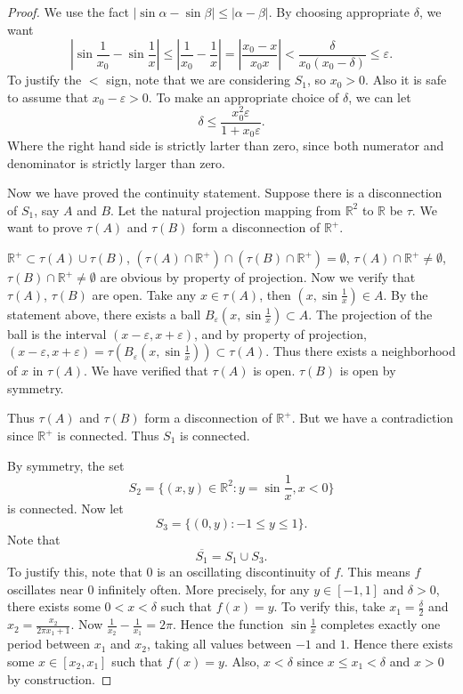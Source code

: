 \begin{enumerate}
\begin{proof}
	We use the fact $\left| \sin \alpha - \sin \beta \right| \le |\alpha-\beta|$.
	By choosing appropriate $\delta$, we want
	\[
		\left| \sin \frac{1}{x_0} - \sin \frac{1}{x} \right| \le \left| \frac{1}{x_0} - \frac{1}{x} \right| = \left| \frac{x_0-x}{x_0x} \right| < \frac{\delta}{x_0(x_0-\delta)} \le \varepsilon
	.\] 
	To justify the $<$ sign, note that we are considering $S_1$, so $x_0 > 0$. Also it is safe to assume that $x_0 - \varepsilon > 0$. To make an appropriate choice of $\delta$, we can let
	\[
		\delta \le \frac{x_0^2 \varepsilon}{1 + x_0 \varepsilon}
	.\] 
	Where the right hand side is strictly larter than zero, since both numerator and denominator is strictly larger than zero.

	Now we have proved the continuity statement. Suppose there is a disconnection of $S_1$, say $A$ and $B$. Let the natural projection mapping from $\mathbb{R}^2$ to $\mathbb{R}$ be $\tau$. We want to prove $\tau(A)$ and $\tau(B)$ form a disconnection of $\mathbb{R}^+$. 

	$\mathbb{R}^+ \subset \tau(A) \cup \tau(B) $, $(\tau(A) \cap \mathbb{R}^+) \cap \left( \tau(B) \cap \mathbb{R}^+ \right) = \emptyset $, $\tau(A) \cap \mathbb{R}^+ \neq \emptyset $, $\tau(B) \cap \mathbb{R}^+ \neq  \emptyset $ are obvious by property of projection. 
	Now we verify that $\tau(A)$, $\tau(B)$ are open. Take any $x \in \tau(A)$, then $(x,\sin \frac{1}{x}) \in A$. By the statement above, there exists a ball $B_\varepsilon(x, \sin \frac{1}{x}) \subset A$. The projection of the ball is the interval $(x-\varepsilon, x+\varepsilon)$, and by property of projection, $(x-\varepsilon, x+\varepsilon)  = \tau(B_\varepsilon(x, \sin \frac{1}{x})) \subset \tau(A)$. Thus there exists a neighborhood of $x$ in $\tau(A)$. We have verified that $\tau(A)$ is open. $\tau(B)$ is open by symmetry.

	Thus $\tau(A)$ and $\tau(B)$ form a disconnection of $\mathbb{R}^+$. But we have a contradiction since $\mathbb{R}^+$ is connected. Thus $S_1$ is connected.

	By symmetry, the set \[
		S_2 = \{(x,y) \in \mathbb{R}^2: y = \sin \frac{1}{x}, x < 0\} 
	\] 
	is connected. Now let 
	\[
		S_3 = \{(0,y): -1 \le y \le 1\} 
	.\] Note that
	\[
		\overline{S_1} = S_1 \cup S_3 
	.\] 
	To justify this, note that $0$ is an oscillating discontinuity of $f$. This means $f$ oscillates near $0$ infinitely often. More precisely, for any $y \in [-1,1]$ and $\delta > 0$, there exists some $0 < x < \delta$ such that $f(x) = y$. To verify this, take $x_1 = \frac{\delta}{2}$ and $x_2 = \frac{x_2}{2 \pi x_1 + 1}$. Now $\frac{1}{x_2} - \frac{1}{x_1} = 2 \pi$. Hence the function $\sin \frac{1}{x}$ completes exactly one period between $x_1$ and $x_2$, taking all values between $-1$ and $1$. Hence there exists some $x \in [x_2,x_1]$ such that $f(x) = y$. Also, $x< \delta$ since $x \le  x_1<\delta$ and $x>0$ by construction.


\end{proof}
\end{enumerate}
